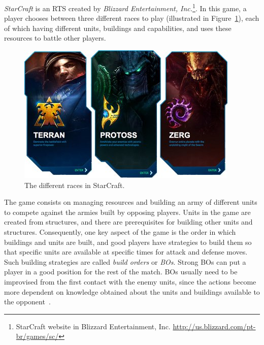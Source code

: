 \textit{StarCraft} is an RTS created by \textit{Blizzard Entertainment, Inc.}\footnote{
StarCraft website in Blizzard Entertainment, Inc. \url{http://us.blizzard.com/pt-br/games/sc/}}.
In this game, a player chooses between three different races to play (illustrated in Figure~\ref{fig:sc-races}), each of which having different units, buildings and capabilities, and uses these resources to battle other players.

\begin{figure}[H]
\centering
\includegraphics[width=400px]{images/sc-races}
\caption{The different races in StarCraft.}
\label{fig:sc-races}
\end{figure}

The game consists on managing resources and building an army of different units to compete against the armies built by opposing players. 
Units in the game are created from structures, and there are prerequisites for building other units and structures. 
Consequently, one key aspect of the game is the order in which buildings and units are built, and good players have strategies to build them so that specific units are available at specific times for attack and defense moves. 
Such building strategies are called \textit{build orders} or \textit{BOs}. 
Strong BOs can put a player in a good position for the rest of the match.
BOs usually need to be improvised from the first contact with the enemy units, since the actions become more dependent on knowledge obtained about the units and buildings available to the opponent~\cite{hagelback2012potential,churchill2011build}.